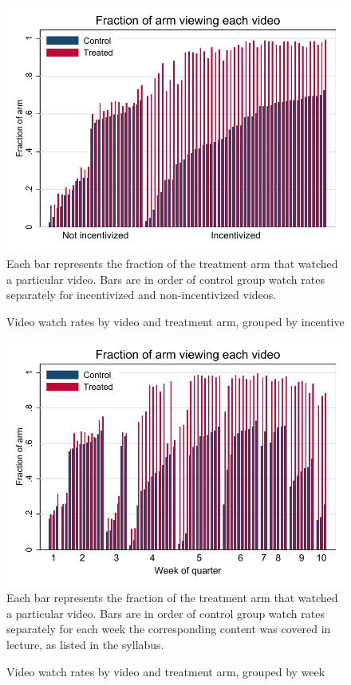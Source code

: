 \documentclass[12pt]{article}
\begin{document}
\clearpage
\begin{figure}[t]
\begin{center}
\caption{Video watch rates by video and treatment arm, grouped by incentive}
\label{video_cdf}
\includegraphics[width=1\textwidth, angle=0]{../plots/bar_uviews.pdf}
\footnotesize Each bar represents the fraction of the treatment arm that watched a particular video. Bars are in order of control group watch rates separately for incentivized and non-incentivized videos.
\end{center}
\end{figure}

\clearpage
\begin{figure}[t]
\begin{center}
\caption{Video watch rates by video and treatment arm, grouped by week}
\label{video_cdf_week}
\includegraphics[width=1\textwidth, angle=0]{../plots/bar_uviews_week.pdf}
\footnotesize Each bar represents the fraction of the treatment arm that watched a particular video. Bars are in order of control group watch rates separately for each week the corresponding content was covered in lecture, as listed in the syllabus.
\end{center}
\end{figure}
\end{document}
